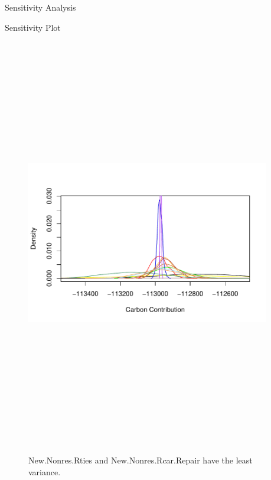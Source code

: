\documentclass[final]{beamer}\usepackage[]{graphicx}\usepackage[]{color}
\newlength{\onecolwid}
\newlength{\twocolwid}
\begin{document}
\begin{frame}[t]
\begin{columns}[t]
\begin{column}{\twocolwid}
\begin{columns}[t,totalwidth=\twocolwid]
\begin{column}{\onecolwid}
\begin{block}{Sensitivity Analysis}
\end{block}

\begin{block}{Sensitivity Plot}
\begin{center}
\begin{figure}
    {\includegraphics[width=1\linewidth,height=18cm]{CopyOfHLSensitivityGraph.pdf}}
    \caption{New.Nonres.Rties and New.Nonres.Rcar.Repair have the least variance.}
\end{figure}
\end{center}
\end{block}


\end{column} %

\begin{column}{\onecolwid} %


\end{column}
\end{columns}
\end{column}
\end{columns}
\end{frame}
\end{document}
